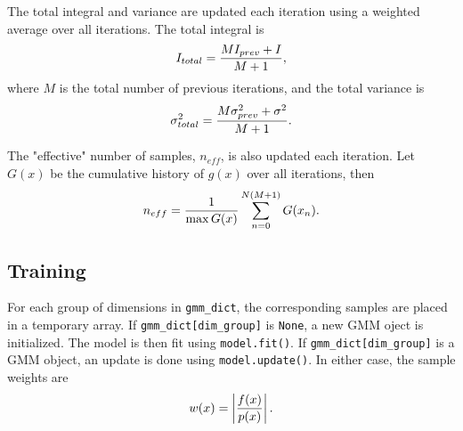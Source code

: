 \documentclass{article}
\begin{document}
The total integral and variance are updated each iteration using a weighted average
over all iterations. The total integral is
\begin{equation}
    I_{total} = {{M I_{prev} + I} \over {M + 1}},
\end{equation}
where $M$ is the total number of previous iterations, and the total variance is
\begin{equation}
    \sigma^2_{total} = {{M \sigma^2_{prev} + \sigma^2} \over {M + 1}}.
\end{equation}

The "effective" number of samples, $n_{eff}$, is also updated each iteration. Let
$G(x)$ be the cumulative history of $g(x)$ over all iterations, then
\begin{equation}
    n_{eff} = {1 \over \max{G(x)}} \sum_{n=0}^{N (M+1)} G(x_n).
\end{equation}

\subsection{Training}

For each group of dimensions in \texttt{gmm\_dict}, the corresponding samples
are placed in a temporary array. If \texttt{gmm\_dict[dim\_group]} is
\texttt{None}, a new GMM oject is initialized. The model is then fit using
\texttt{model.fit()}. If \texttt{gmm\_dict[dim\_group]} is a GMM object,
an update is done using \texttt{model.update()}. In either case, the sample
weights are
\begin{equation}
    w(x) = \left| {f(x) \over p(x)} \right|.
\end{equation}
\end{document}
